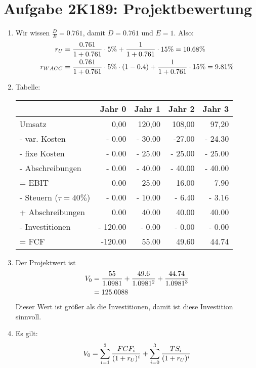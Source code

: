\documentclass{article}
\begin{document}
	\section*{Aufgabe 2K189: Projektbewertung}
	\begin{enumerate}[label=(\alph*)]
		\item Wir wissen $\frac{D}{E}=0.761$, damit $D=0.761$ und $E=1$. Also:
		\begin{align}
			r_U &= \frac{0.761}{1 + 0.761} \cdot 5\% + \frac{1}{1 + 0.761} \cdot 15\% = 10.68\% \notag \\
			r_{WACC} &= \frac{0.761}{1 + 0.761} \cdot 5\% \cdot (1-0.4) + \frac{1}{1 + 0.761} \cdot 15\% = 9.81\% \notag
		\end{align}
		\item Tabelle:
		\begin{center}
			\begin{tabular}{l|r|r|r|r}
				& \textbf{Jahr 0} & \textbf{Jahr 1} & \textbf{Jahr 2} & \textbf{Jahr 3} \\
				\hline
				Umsatz & 0,00 & 120,00 & 108,00 & 97,20 \\
				 - var. Kosten & - 0.00 & - 30.00 & -27.00 & - 24.30 \\
				 - fixe Kosten & - 0.00 & - 25.00 & - 25.00 & - 25.00 \\
				 - Abschreibungen & - 0.00 & - 40.00 & - 40.00 & - 40.00 \\
				 \hline
				 = EBIT & 0.00 & 25.00 & 16.00 & 7.90 \\
				 - Steuern ($\tau=40\%$) & - 0.00 & - 10.00 & - 6.40 & - 3.16 \\
				 + Abschreibungen & 0.00 & 40.00 & 40.00 & 40.00 \\
				 - Investitionen & - 120.00 & - 0.00 & - 0.00 & - 0.00 \\
				 \hline
				 = FCF & -120.00 & 55.00 & 49.60 & 44.74
			\end{tabular}
		\end{center}
		\item Der Projektwert ist
		\begin{align}
			V_0 &= \frac{55}{1.0981} + \frac{49.6}{1.0981^2} + \frac{44.74}{1.0981^3} \notag \\
			&= 125.0088 \notag
		\end{align}
		Dieser Wert ist größer als die Investitionen, damit ist diese Investition sinnvoll.
		\item Es gilt:
		\begin{align}
			V_0 &= \sum_{i=1}^3 \frac{FCF_i}{(1+r_U)^i} + \sum_{i=0}^3 \frac{TS_i}{(1+r_U)^i} \notag \\

\end{align}
\end{enumerate}
\end{document}
